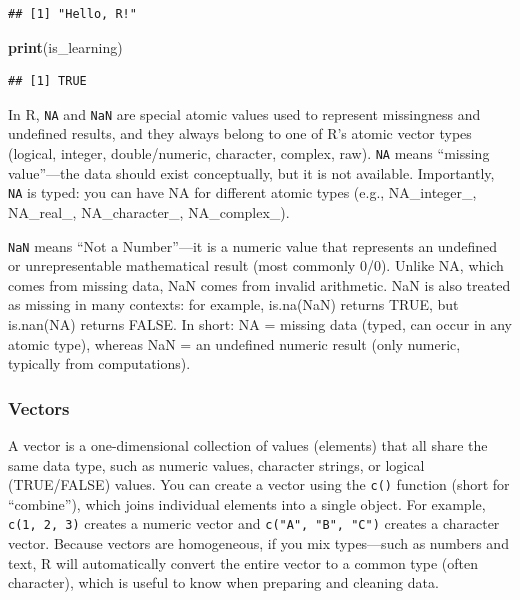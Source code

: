 \documentclass[
  11pt,
]{article}
\newenvironment{Shaded}{\begin{snugshade}}{\end{snugshade}}
\newcommand{\FunctionTok}[1]{\textcolor[rgb]{0.13,0.29,0.53}{\textbf{#1}}}
\newcommand{\NormalTok}[1]{#1}
\begin{document}
\begin{verbatim}
## [1] "Hello, R!"
\end{verbatim}

\begin{Shaded}
\begin{Highlighting}[]
\FunctionTok{print}\NormalTok{(is\_learning)}
\end{Highlighting}
\end{Shaded}

\begin{verbatim}
## [1] TRUE
\end{verbatim}

In R, \texttt{NA} and \texttt{NaN} are special atomic values used to
represent missingness and undefined results, and they always belong to
one of R's atomic vector types (logical, integer, double/numeric,
character, complex, raw). \texttt{NA} means ``missing value''---the data
should exist conceptually, but it is not available. Importantly,
\texttt{NA} is typed: you can have NA for different atomic types (e.g.,
NA\_integer\_, NA\_real\_, NA\_character\_, NA\_complex\_).

\texttt{NaN} means ``Not a Number''---it is a numeric value that
represents an undefined or unrepresentable mathematical result (most
commonly 0/0). Unlike NA, which comes from missing data, NaN comes from
invalid arithmetic. NaN is also treated as missing in many contexts: for
example, is.na(NaN) returns TRUE, but is.nan(NA) returns FALSE. In
short: NA = missing data (typed, can occur in any atomic type), whereas
NaN = an undefined numeric result (only numeric, typically from
computations).

\subsubsection{Vectors}\label{vectors}

A vector is a one-dimensional collection of values (elements) that all
share the same data type, such as numeric values, character strings, or
logical (TRUE/FALSE) values. You can create a vector using the
\texttt{c()} function (short for ``combine''), which joins individual
elements into a single object. For example, \texttt{c(1,\ 2,\ 3)}
creates a numeric vector and \texttt{c("A",\ "B",\ "C")} creates a
character vector. Because vectors are homogeneous, if you mix
types---such as numbers and text, R will automatically convert the
entire vector to a common type (often character), which is useful to
know when preparing and cleaning data.
\end{document}
